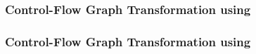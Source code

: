 \begin{frame}[t]
	\frametitle{Control-Flow Graph Transformation using \qvasr}
	\resizebox{\textwidth}{!}{}
\end{frame}

\begin{frame}[t]
	\frametitle{Control-Flow Graph Transformation using \qvasr}
	\begin{columns}[c]
		\begin{column}{0.5\textwidth}
			\resizebox{0.75\textwidth}{!}{}
		\end{column}
	\end{columns}
\end{frame}